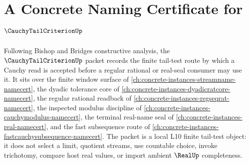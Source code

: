 \chapter{A Concrete Naming Certificate for $\CauchyTailCriterionUp$}
\label{ch:concrete-instances-cauchy-tail-criterion-namecert}

Following Bishop and Bridges constructive analysis, the $\CauchyTailCriterionUp$ packet records the finite tail-test route by which a Cauchy read is accepted before a regular rational or real-seal consumer may use it. It sits over the finite window surface of \autoref{ch:concrete-instances-streamname-namecert}, the dyadic tolerance core of \autoref{ch:concrete-instances-dyadicratcore-namecert}, the regular rational readback of \autoref{ch:concrete-instances-regseqrat-namecert}, the inspected modulus discipline of \autoref{ch:concrete-instances-cauchymodulus-namecert}, the terminal real-name seal of \autoref{ch:concrete-instances-real-namecert}, and the fast subsequence route of \autoref{ch:concrete-instances-fastcauchysubsequence-namecert}. The packet is a local L10 finite tail-test object: it does not select a limit, quotient streams, use countable choice, invoke trichotomy, compare host real values, or import ambient $\RealUp$ completeness.

